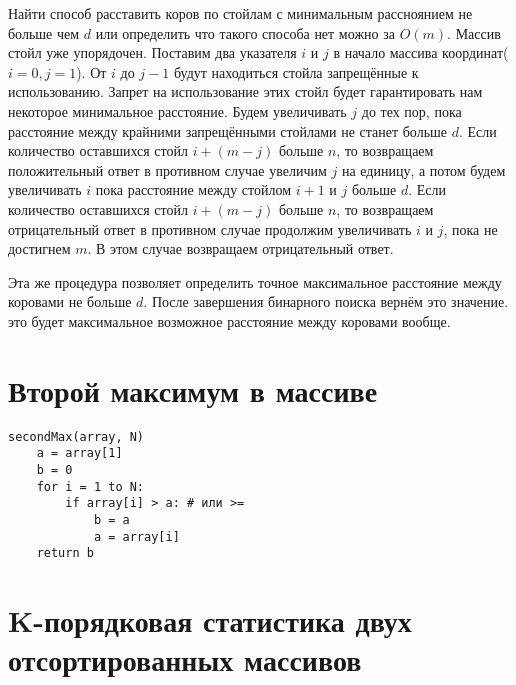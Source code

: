 \documentclass{article}
\begin{document}
Найти способ расставить коров по стойлам с минимальным рассноянием не больше
чем $d$ или определить что такого способа нет можно за $O(m)$. Массив стойл уже
упорядочен. Поставим два указателя $i$ и $j$ в начало массива координат($i = 0,
j = 1$). От $i$ до $j - 1$ будут находиться стойла запрещённые к использованию.
Запрет на использование этих стойл будет гарантировать нам некоторое
минимальное расстояние. Будем увеличивать $j$ до тех пор, пока расстояние между
крайними запрещёнными стойлами не станет больше $d$. Если количество оставшихся
стойл $i + (m - j)$ больше $n$, то возвращаем положительный ответ в противном
случае увеличим $j$ на единицу, а потом будем увеличивать $i$ пока расстояние
между стойлом $i+1$ и $j$ больше $d$. Если количество оставшихся стойл $i + (m
- j)$ больше $n$, то возвращаем отрицательный ответ в противном случае
продолжим увеличивать $i$ и $j$, пока не достигнем $m$. В этом случае
возвращаем отрицательный ответ. 

Эта же процедура позволяет определить точное максимальное расстояние между
коровами не больше $d$. После завершения бинарного поиска вернём это значение.
это будет максимальное возможное расстояние между коровами вообще.

\pagebreak

\section{Второй максимум в массиве}

\begin{verbatim}
secondMax(array, N)
    a = array[1]
    b = 0
    for i = 1 to N:
        if array[i] > a: # или >=
            b = a
            a = array[i]
    return b
\end{verbatim}

\pagebreak

\section{K-порядковая статистика двух отсортированных массивов}
\end{document}
